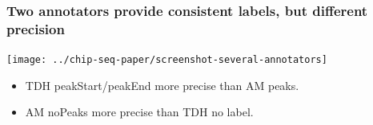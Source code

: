 \documentclass{beamer}
\begin{document}





\begin{frame}
  \frametitle{Two annotators provide consistent labels, but different
    precision}
  \texttt{[image: ../chip-seq-paper/screenshot-several-annotators]}

  \begin{itemize}
  \item TDH peakStart/peakEnd more precise than AM peaks.
  \item AM noPeaks more precise than TDH no label.
  \end{itemize}
\end{frame}
\end{document}
